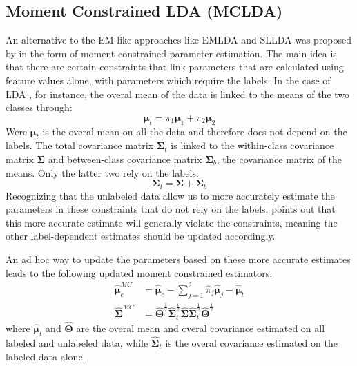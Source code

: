 \subsection{Moment Constrained LDA (MCLDA)}
An alternative to the EM-like approaches like EMLDA and SLLDA was proposed by \cite{Loog2010} in the form of moment constrained parameter estimation. The main idea is that there are certain constraints that link parameters that are calculated using feature values alone, with parameters which require the labels. In the case of LDA \cite{Loog2014a}, for instance, the overal mean of the data is linked to the means of the two classes through:
\begin{equation}
\label{eq:constraintmean}
\boldsymbol{\mu}_t=\pi_1 \boldsymbol{\mu}_1 + \pi_2 \boldsymbol{\mu}_2
\end{equation}
Were $\boldsymbol{\mu}_t$ is the overal mean on all the data and therefore does not depend on the labels.
The total covariance matrix $\mathbf{\Sigma}_t$ is linked to the within-class covariance matrix $\mathbf{\Sigma}$ and between-class covariance matrix $\mathbf{\Sigma}_b$, the covariance matrix of the means. Only the latter two rely on the labels:
\begin{equation}
\label{eq:constraintcovariance}
\mathbf{\Sigma}_t=\mathbf{\Sigma} + \mathbf{\Sigma}_b
\end{equation}
Recognizing that the unlabeled data allow us to more accurately estimate the parameters in these constraints that do not rely on the labels, \cite{Loog2014a} points out that this more accurate estimate will generally violate the constraints, meaning the other label-dependent estimates should be updated accordingly.

An ad hoc way to update the parameters based on these more accurate estimates \cite{Loog2014a} leads to the following updated moment constrained estimators:
\begin{align}
\hat{\boldsymbol{\mu}}_c^{MC} & =\hat{\boldsymbol{\mu}}_c - \sum_{j=1}^{2} \hat{\pi}_j \hat{\boldsymbol{\mu}}_j-\hat{\boldsymbol{\mu}}_t \\
\hat{\mathbf{\Sigma}}^{MC} &= \hat{\mathbf{\Theta}}^{\frac{1}{2}} \hat{\mathbf{\Sigma}}_t^{\frac{1}{2}} \hat{\mathbf{\Sigma}} \hat{\mathbf{\Sigma}}_t^{\frac{1}{2}} \hat{\mathbf{\Theta}}^{\frac{1}{2}}
\end{align}
where $\hat{\boldsymbol{\mu}}_t$ and $\hat{\mathbf{\Theta}}$ are the overal mean and overal covariance estimated on all labeled and unlabeled data, while $\hat{\mathbf{\Sigma}}_t$ is the overal covariance estimated on the labeled data alone.

